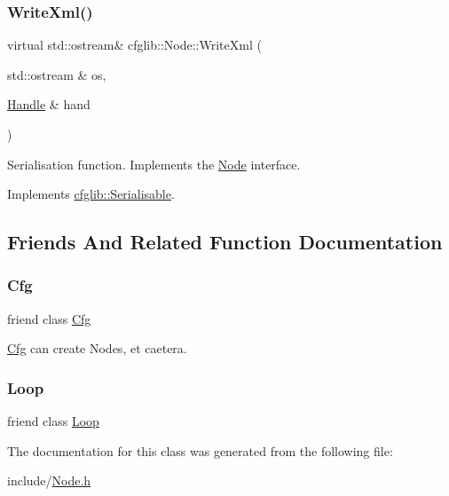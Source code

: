 \subsubsection{\texorpdfstring{Write\+Xml()}{WriteXml()}}
{\footnotesize\ttfamily virtual std\+::ostream\& cfglib\+::\+Node\+::\+Write\+Xml (\begin{DoxyParamCaption}\item[{std\+::ostream \&}]{os,  }\item[{\hyperlink{classcfglib_1_1Handle}{Handle} \&}]{hand }\end{DoxyParamCaption})\hspace{0.3cm}{\ttfamily [virtual]}}

Serialisation function. Implements the {\ttfamily \hyperlink{classcfglib_1_1Node}{Node}} interface. 

Implements \hyperlink{classcfglib_1_1Serialisable_aaeb80cc7397ad312e5ae34f39412ce42}{cfglib\+::\+Serialisable}.



\subsection{Friends And Related Function Documentation}
\mbox{\label{classcfglib_1_1Node_aad28e913031e836a51d46ca3a1a3b68b}} 
\subsubsection{\texorpdfstring{Cfg}{Cfg}}
{\footnotesize\ttfamily friend class \hyperlink{classcfglib_1_1Cfg}{Cfg}\hspace{0.3cm}{\ttfamily [friend]}}

\hyperlink{classcfglib_1_1Cfg}{Cfg} can create Nodes, et caetera. \mbox{\label{classcfglib_1_1Node_a6f7095d721dd1dbd490d97c028eb676f}} 
\subsubsection{\texorpdfstring{Loop}{Loop}}
{\footnotesize\ttfamily friend class \hyperlink{classcfglib_1_1Loop}{Loop}\hspace{0.3cm}{\ttfamily [friend]}}



The documentation for this class was generated from the following file\+:\begin{DoxyCompactItemize}
\item 
include/\hyperlink{Node_8h}{Node.\+h}\end{DoxyCompactItemize}
